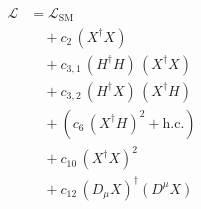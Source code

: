 \documentclass{article}
\begin{document}
\begin{align*}\mathcal{L} &= \mathcal{L}_{\mathrm{SM}}\\ &\quad + c_{2}\,\left(X^{\dagger} X\right)\\ &\quad + c_{3,1}\,\left(H^{\dagger} H\right)\,\left(X^{\dagger} X\right)\\ &\quad + c_{3,2}\,\left(H^{\dagger} X\right)\,\left(X^{\dagger} H\right)\\ &\quad + \left(c_{6}\,{\left(X^{\dagger} H\right)}^{2} + \mathrm{h.c.}\right)\\ &\quad + c_{10}\,{\left(X^{\dagger} X\right)}^{2}\\ &\quad + c_{12}\,\left(D_{\mu} X\right)^{\dagger}\left(D^{\mu} X\right)\end{align*}
\end{document}
